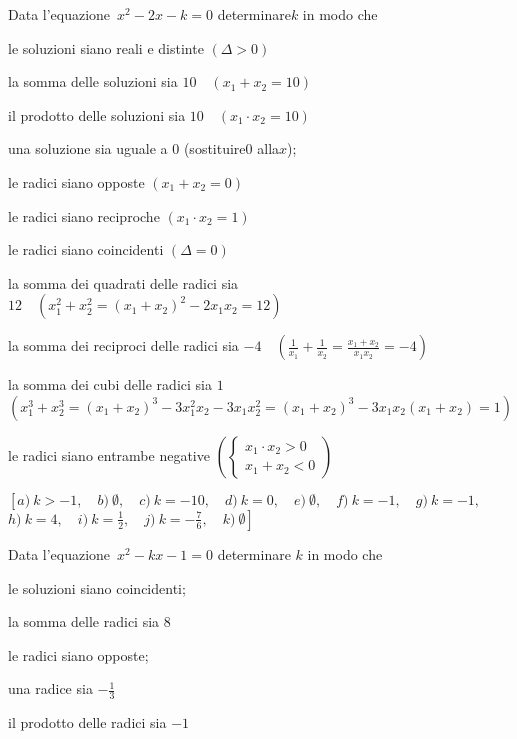 \begin{esercizio}[\Ast]
 \label{ese:3.97}
Data l'equazione~$x^{2}-2 x-k = 0$ determinare$k$ in modo che
\begin{enumeratea}
\item le soluzioni siano reali e distinte \quad$(\Delta>0)$
\item la somma delle soluzioni sia $10 \quad (x_{1} + x_{2} = 10)$
\item il prodotto delle soluzioni sia $10 \quad (x_{1} \cdot x_{2} = 10)$
\item una soluzione sia uguale a $0$ \quad (sostituire$0$ alla$x$);~
\item le radici siano opposte \quad $(x_{1} + x_{2} = 0)$
\item le radici siano reciproche \quad $(x_{1} \cdot x_{2} = 1)$
\item le radici siano coincidenti \quad $(\Delta=0)$
\item la somma dei quadrati delle radici sia $12 \quad \left(x_{1}^{2} + 
x_{2}^{2} = (x_{1} + x_{2})^{2}-2x_{1} x_{2} = 12\right)$
\item la somma dei reciproci delle radici sia $-4 \quad \left(\frac{1}{x_{1}} + 
\frac{1}{x_{2}} = \frac{x_{1} +x_{2}}{x_{1} x_{2}} =-4 \right)$
\item la somma dei cubi delle radici sia $1$ \protect\\$\left( x_{1}^{3} + 
x_{2}^{3} = (x_{1} + x_{2})^{3}-3x_{1}^{2} x_{2}-3x_{1} x_{2}^{2} = (x_{1} + 
x_{2})^{3}-3x_{1} x_{2} (x_{1} + x_{2}) = 1\right)$
\item le radici siano entrambe negative $\left(\left\{\begin{array}{l} x_{1} 
\cdot x_{2} > 0 \\x_{1} + x_{2} < 0 \end{array}\right.\right)$
\end{enumeratea}
\end{esercizio}

\begin{flushright}
$\left[a)~k >-1,\quad b)~\emptyset,\quad c)~k =-10,\quad 
        d)~k = 0,\quad e)~ \emptyset ,\quad f)~ k =-1 ,\quad 
        g)~ k =-1 ,\quad \right.$
       $\left. h)~ k = 4 ,\quad i)~ k = \frac{1}{2} ,\quad 
        j)~ k =-\frac{7}{6} ,\quad k)~\emptyset\right]$
\end{flushright}

\begin{esercizio}[\Ast]
 \label{ese:3.98}
Data l'equazione~$x^{2}-k x-1 = 0$ determinare $k$ in modo che
\begin{enumeratea}
\item le soluzioni siano coincidenti;~
\item la somma delle radici sia $8$
\item le radici siano opposte;~
\item una radice sia $- \frac{1}{3}$
\item il prodotto delle radici sia $-1$
\end{enumeratea}
\end{esercizio}

